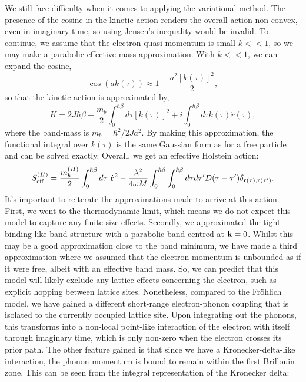We still face difficulty when it comes to applying the variational method. The presence of the cosine in the kinetic action renders the overall action non-convex, even in imaginary time, so using Jensen's inequality would be invalid. To continue, we assume that the electron quasi-momentum is small $k << 1$, so we may make a parabolic effective-mass approximation. With $k << 1$, we can expand the cosine,
\begin{equation}
    \cos(a k(\tau)) \approx 1 - \frac{a^2 [k(\tau)]^2}{2} ,
\end{equation}
so that the kinetic action is approximated by,
\begin{equation}
    K = 2 J \hbar \beta - \frac{m_b}{2} \int_0^{\hbar\beta} d\tau \left[k(\tau)\right]^2 + i \int_0^{\hbar\beta} d\tau k(\tau) \Dot{r}(\tau) ,
\end{equation}
where the band-mass is $m_b = \hbar^2 / 2 J a^2$. By making this approximation, the functional integral over $k(\tau)$ is the same Gaussian form as for a free particle and can be solved exactly. Overall, we get an effective Holstein action:
\begin{equation}
    S_{\text{eff}}^{(H)} = \frac{m^{(H)}_b}{2} \int_0^{\hbar\beta} d\tau\ \vb{\Dot{r}}^2 - \frac{\lambda^2}{4 \omega M} \int_0^{\hbar\beta} \int_0^{\hbar\beta} d\tau d\tau' D(\tau - \tau') \delta_{\vb{r}(\tau), \vb{r}(\tau')} .
\end{equation}
It's important to reiterate the approximations made to arrive at this action. First, we went to the thermodynamic limit, which means we do not expect this model to capture any finite-size effects. Secondly, we approximated the tight-binding-like band structure with a parabolic band centred at $\vb{k} = 0$. Whilst this may be a good approximation close to the band minimum, we have made a third approximation where we assumed that the electron momentum is unbounded as if it were free, albeit with an effective band mass. So, we can predict that this model will likely exclude any lattice effects concerning the electron, such as explicit hopping between lattice sites. Nonetheless, compared to the Fr\"ohlich model, we have gained a different short-range electron-phonon coupling that is isolated to the currently occupied lattice site. Upon integrating out the phonons, this transforms into a non-local point-like interaction of the electron with itself through imaginary time, which is only non-zero when the electron crosses its prior path. The other feature gained is that since we have a Kronecker-delta-like interaction, the phonon momentum is bound to remain within the first Brillouin zone. This can be seen from the integral representation of the Kronecker delta:
